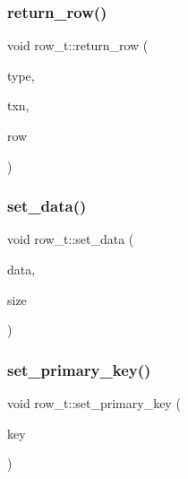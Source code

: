 \mbox{\label{classrow__t_ad444dabf917bd4f85766f6c80d7ec74f}} 
\subsubsection{\texorpdfstring{return\+\_\+row()}{return\_row()}}
{\footnotesize\ttfamily void row\+\_\+t\+::return\+\_\+row (\begin{DoxyParamCaption}\item[{\hyperlink{global_8h_a567f81b0ae33b00d189d7714e9fde0bc}{access\+\_\+t}}]{type,  }\item[{\hyperlink{classtxn__man}{txn\+\_\+man} $\ast$}]{txn,  }\item[{\hyperlink{classrow__t}{row\+\_\+t} $\ast$}]{row }\end{DoxyParamCaption})}

\mbox{\label{classrow__t_a051b2e198e08b7ef586726fb93546673}} 
\subsubsection{\texorpdfstring{set\+\_\+data()}{set\_data()}}
{\footnotesize\ttfamily void row\+\_\+t\+::set\+\_\+data (\begin{DoxyParamCaption}\item[{char $\ast$}]{data,  }\item[{uint64\+\_\+t}]{size }\end{DoxyParamCaption})}

\mbox{\label{classrow__t_a1d331378ab894cb05c1ff18d0483b5eb}} 
\subsubsection{\texorpdfstring{set\+\_\+primary\+\_\+key()}{set\_primary\_key()}}
{\footnotesize\ttfamily void row\+\_\+t\+::set\+\_\+primary\+\_\+key (\begin{DoxyParamCaption}\item[{uint64\+\_\+t}]{key }\end{DoxyParamCaption})\hspace{0.3cm}{\ttfamily [inline]}}

